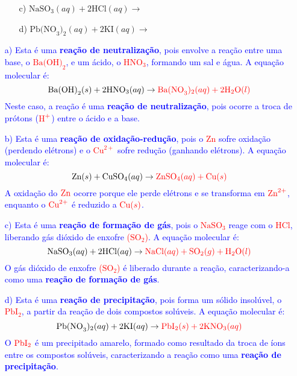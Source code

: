 \documentclass[a4paper, 12pt]{article}
\begin{document}
\begin{enumerate}
\begin{enumerate}[align=left, labelsep=-0.5em]
              \item[c)] $\text{NaSO}_{3}(aq) + 2\text{HCl}(aq) \rightarrow$

              \item[d)] $\text{Pb(NO}_{3})_{2}(aq) + 2\text{KI}(aq) \rightarrow$
          \end{enumerate}
    \item[\textcolor{blue}{a)}] \textcolor{blue}{Esta é uma \textbf{reação de neutralização}, pois envolve a reação entre uma base, o \textcolor{red}{\(\text{Ba(OH)}_{2}\)}, e um ácido, o \textcolor{red}{\(\text{HNO}_{3}\)}, formando um sal e água. A equação molecular é:}
          \[
              \text{Ba(OH)}_{2}(s) + 2\text{HNO}_{3}(aq) \rightarrow \textcolor{red}{\text{Ba(NO}_{3})_{2}(aq) + 2\textcolor{red}{\text{H}_2\text{O}}(l)}
          \]
          \textcolor{blue}{Neste caso, a reação é uma \textbf{reação de neutralização}, pois ocorre a troca de prótons (\(\textcolor{red}{\text{H}^+}\)) entre o ácido e a base.}

    \item[\textcolor{blue}{b)}] \textcolor{blue}{Esta é uma \textbf{reação de oxidação-redução}, pois o \textcolor{red}{\(\text{Zn}\)} sofre oxidação (perdendo elétrons) e o \textcolor{red}{\(\text{Cu}^{2+}\)} sofre redução (ganhando elétrons). A equação molecular é:}
          \[
              \text{Zn}(s) + \text{CuSO}_{4}(aq) \rightarrow \textcolor{red}{\text{ZnSO}_{4}(aq) + \text{Cu}(s)}
          \]
          \textcolor{blue}{A oxidação do \(\textcolor{red}{\text{Zn}}\) ocorre porque ele perde elétrons e se transforma em \(\textcolor{red}{\text{Zn}^{2+}}\), enquanto o \(\textcolor{red}{\text{Cu}^{2+}}\) é reduzido a \(\textcolor{red}{\text{Cu}(s)}\).}

    \item[\textcolor{blue}{c)}] \textcolor{blue}{Esta é uma \textbf{reação de formação de gás}, pois o \textcolor{red}{\(\text{NaSO}_3\)} reage com o \textcolor{red}{\(\text{HCl}\)}, liberando gás dióxido de enxofre \textcolor{red}{($\text{SO}_{2}$)}. A equação molecular é:}
          \[
              \text{NaSO}_{3}(aq) + 2\text{HCl}(aq) \rightarrow \textcolor{red}{\text{NaCl}(aq) + \text{SO}_2(g) + \text{H}_2\text{O}(l)}
          \]
          \textcolor{blue}{O gás dióxido de enxofre \textcolor{red}{($\text{SO}_{2}$)} é liberado durante a reação, caracterizando-a como uma \textbf{reação de formação de gás}.}

    \item[\textcolor{blue}{d)}] \textcolor{blue}{Esta é uma \textbf{reação de precipitação}, pois forma um sólido insolúvel, o \textcolor{red}{\(\text{PbI}_{2}\)}, a partir da reação de dois compostos solúveis. A equação molecular é:}
          \[
              \text{Pb(NO}_{3})_{2}(aq) + 2\text{KI}(aq) \rightarrow \textcolor{red}{\text{PbI}_{2}(s) + 2\text{KNO}_{3}(aq)}
          \]
          \textcolor{blue}{O \(\textcolor{red}{\text{PbI}_{2}}\) é um precipitado amarelo, formado como resultado da troca de íons entre os compostos solúveis, caracterizando a reação como uma \textbf{reação de precipitação}.}


\end{enumerate}
\end{document}
